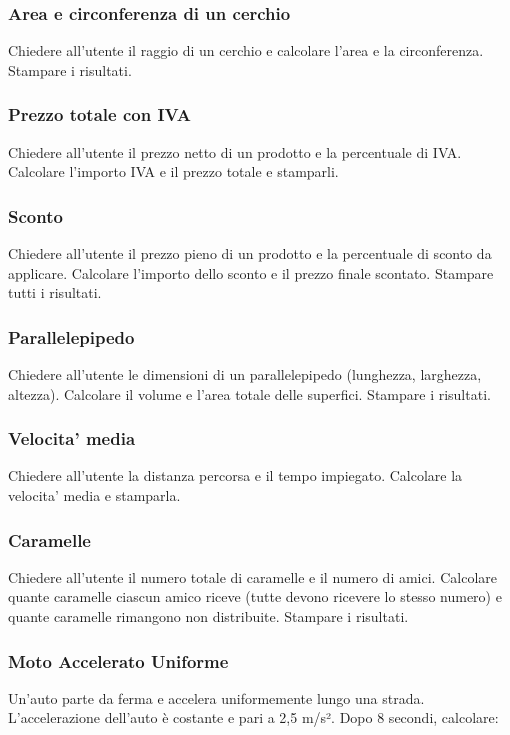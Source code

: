 \documentclass[a4paper,12pt]{article}
\begin{document}
	\subsubsection{Area e circonferenza di un cerchio}
	Chiedere all'utente il raggio di un cerchio e calcolare l'area e la circonferenza. Stampare i risultati.
	
	\subsubsection{Prezzo totale con IVA}
	Chiedere all'utente il prezzo netto di un prodotto e la percentuale di IVA. Calcolare l'importo IVA e il prezzo totale e stamparli.
	
	\subsubsection{Sconto}
	Chiedere all'utente il prezzo pieno di un prodotto e la percentuale di sconto da applicare. Calcolare l'importo dello sconto e il prezzo finale scontato. Stampare tutti i risultati.
	
	
	
	\subsubsection{Parallelepipedo}
	Chiedere all'utente le dimensioni di un parallelepipedo (lunghezza, larghezza, altezza). Calcolare il volume e l'area totale delle superfici. Stampare i risultati.
	
	\subsubsection{Velocita' media}
	Chiedere all'utente la distanza percorsa e il tempo impiegato. Calcolare la velocita' media e stamparla.
	
	\subsubsection{Caramelle}
	Chiedere all'utente il numero totale di caramelle e il numero di amici. Calcolare quante caramelle ciascun amico riceve (tutte devono ricevere lo stesso numero) e quante caramelle rimangono non distribuite. Stampare i risultati.
	
	
	\subsubsection{Moto Accelerato Uniforme}
	Un’auto parte da ferma e accelera uniformemente lungo una strada. L’accelerazione dell’auto è costante e pari a 2,5 m/s². Dopo 8 secondi, calcolare:
	
\end{document}
